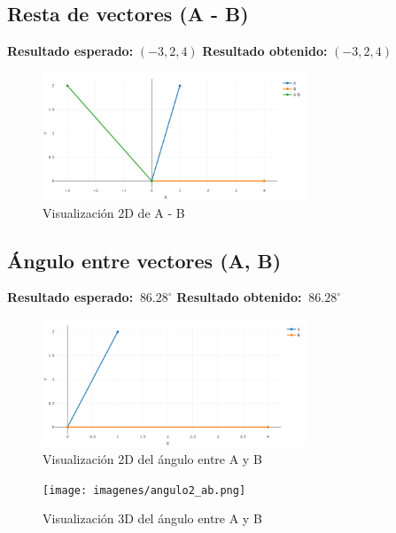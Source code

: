 \documentclass[12pt,a4paper]{article}
\begin{document}
\subsection{Resta de vectores (A - B)}
\textbf{Resultado esperado:} $(-3, 2, 4)$  
\textbf{Resultado obtenido:} $(-3, 2, 4)$  

\begin{figure}[H]
    \centering
    \includegraphics[width=0.7\textwidth]{imagenes/resta_ab.png} %
    \caption{Visualización 2D de A - B}
\end{figure}


\subsection{Ángulo entre vectores (A, B)}
\textbf{Resultado esperado:} $~86.28^\circ$  
\textbf{Resultado obtenido:} $~86.28^\circ$  

\begin{figure}[H]
    \centering
    \includegraphics[width=0.7\textwidth]{imagenes/angulo_ab.png} %
    \caption{Visualización 2D del ángulo entre A y B}
\end{figure}
\begin{figure}[H]
    \centering
    \texttt{[image: imagenes/angulo2\_ab.png]} %
    \caption{Visualización 3D del ángulo entre A y B}
\end{figure}
\end{document}
